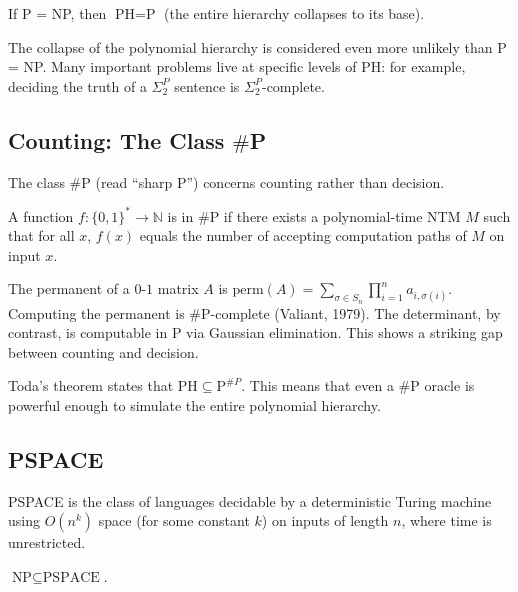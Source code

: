 \begin{proposition}
If P = NP, then $\text{PH} = \text{P}$ (the entire hierarchy collapses to its base).
\end{proposition}

The collapse of the polynomial hierarchy is considered even more unlikely than P = NP. Many important problems live at specific levels of PH: for example, deciding the truth of a $\Sigma_2^P$ sentence is $\Sigma_2^P$-complete.

\subsection{Counting: The Class $\#$P}

The class $\#$P (read ``sharp P'') concerns counting rather than decision.

\begin{definition}[$\#$P]
A function $f: \{0,1\}^* \to \mathbb{N}$ is in $\#$P if there exists a polynomial-time NTM $M$ such that for all $x$, $f(x)$ equals the number of accepting computation paths of $M$ on input $x$.
\end{definition}

\begin{example}
The permanent of a $0$-$1$ matrix $A$ is $\text{perm}(A) = \sum_{\sigma \in S_n} \prod_{i=1}^n a_{i,\sigma(i)}$. Computing the permanent is $\#$P-complete (Valiant, 1979). The determinant, by contrast, is computable in P via Gaussian elimination. This shows a striking gap between counting and decision.
\end{example}

\begin{remark}
Toda's theorem states that $\text{PH} \subseteq \text{P}^{\#P}$. This means that even a $\#$P oracle is powerful enough to simulate the entire polynomial hierarchy.
\end{remark}

\subsection{PSPACE}

\begin{definition}[PSPACE]
PSPACE is the class of languages decidable by a deterministic Turing machine using $O(n^k)$ space (for some constant $k$) on inputs of length $n$, where time is unrestricted.
\end{definition}

\begin{proposition}
$\text{NP} \subseteq \text{PSPACE}$.
\end{proposition}

